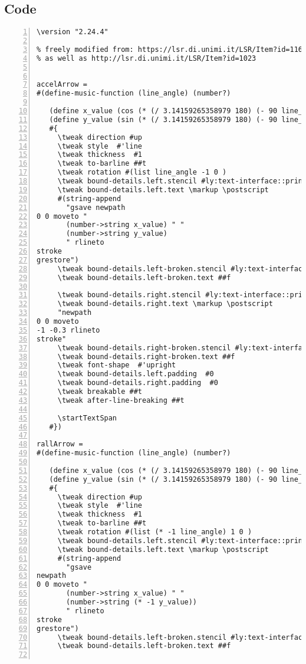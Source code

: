 \subsection{Code}
\begin{Verbatim}[numbers=left,xleftmargin=5mm]
\version "2.24.4"

% freely modified from: https://lsr.di.unimi.it/LSR/Item?id=1168
% as well as http://lsr.di.unimi.it/LSR/Item?id=1023


accelArrow =
#(define-music-function (line_angle) (number?)

   (define x_value (cos (* (/ 3.14159265358979 180) (- 90 line_angle))))
   (define y_value (sin (* (/ 3.14159265358979 180) (- 90 line_angle))))
   #{
     \tweak direction #up
     \tweak style  #'line
     \tweak thickness  #1
     \tweak to-barline ##t
     \tweak rotation #(list line_angle -1 0 )
     \tweak bound-details.left.stencil #ly:text-interface::print
     \tweak bound-details.left.text \markup \postscript
     #(string-append
       "gsave newpath 
0 0 moveto "
       (number->string x_value) " "
       (number->string y_value)
       " rlineto 
stroke 
grestore")
     \tweak bound-details.left-broken.stencil #ly:text-interface::print
     \tweak bound-details.left-broken.text ##f

     \tweak bound-details.right.stencil #ly:text-interface::print
     \tweak bound-details.right.text \markup \postscript
     "newpath 
0 0 moveto 
-1 -0.3 rlineto 
stroke"
     \tweak bound-details.right-broken.stencil #ly:text-interface::print
     \tweak bound-details.right-broken.text ##f
     \tweak font-shape  #'upright
     \tweak bound-details.left.padding  #0
     \tweak bound-details.right.padding  #0
     \tweak breakable ##t
     \tweak after-line-breaking ##t

     \startTextSpan
   #})

rallArrow =
#(define-music-function (line_angle) (number?)

   (define x_value (cos (* (/ 3.14159265358979 180) (- 90 line_angle))))
   (define y_value (sin (* (/ 3.14159265358979 180) (- 90 line_angle))))
   #{
     \tweak direction #up
     \tweak style  #'line
     \tweak thickness  #1
     \tweak to-barline ##t
     \tweak rotation #(list (* -1 line_angle) 1 0 )
     \tweak bound-details.left.stencil #ly:text-interface::print
     \tweak bound-details.left.text \markup \postscript
     #(string-append
       "gsave 
newpath 
0 0 moveto "
       (number->string x_value) " "
       (number->string (* -1 y_value))
       " rlineto 
stroke 
grestore")
     \tweak bound-details.left-broken.stencil #ly:text-interface::print
     \tweak bound-details.left-broken.text ##f


\end{Verbatim}
